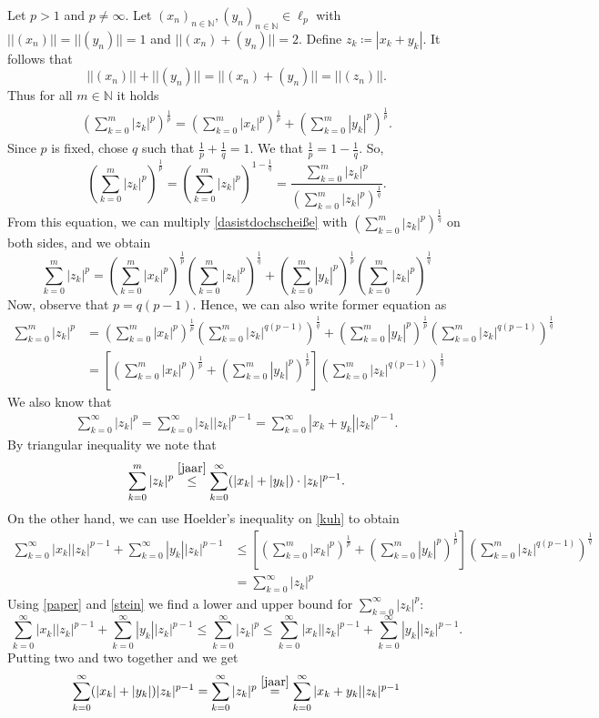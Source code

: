 \documentclass[a4paper]{article}
\begin{document}
Let $p > 1$ and $p \neq \infty$. Let $(x_n)_{n \in \mathbb N}, (y_n)_{n \in \mathbb N} \in \ell_p$ with $||(x_n)|| = || (y_n) || = 1$ and $||(x_n) + (y_n)|| = 2$. Define $z_k \coloneqq |x_k + y_k|$. It follows that
\[
    ||(x_n)|| + || (y_n)|| = ||(x_n) + (y_n) || = ||(z_n)||.
\]
Thus for all $m \in \mathbb N$ it holds
\begin{align}\label{dasistdochscheiße}
    (\sum^m_{k=0} |z_k|^p)^{\frac{1}{p}} = (\sum^m_{k=0} |x_k|^p)^{\frac{1}{p}} + (\sum^m_{k=0} |y_k|^p)^{\frac{1}{p}}.
\end{align}
Since $p$ is fixed, chose $q$ such that $\frac{1}{p}+\frac{1}{q} = 1$. We that $\frac{1}{p} = 1 - \frac{1}{q}$. So, $$(\sum^m_{k=0} |z_k|^p)^{\frac{1}{p}} = (\sum^m_{k=0} |z_k|^p)^{1 - \frac{1}{q}} = \frac{\sum^m_{k=0} |z_k|^p}{(\sum^m_{k=0} |z_k|^p)^{\frac{1}{q}}}.$$
From this equation, we can multiply \eqref{dasistdochscheiße} with $(\sum^m_{k=0} |z_k|^p)^{\frac{1}{q}}$ on both sides, and we obtain
\[
    \sum^m_{k=0} |z_k|^p = (\sum^m_{k=0} |x_k|^p)^{\frac{1}{p}}(\sum^m_{k=0} |z_k|^p)^{\frac{1}{q}} + (\sum^m_{k=0} |y_k|^p)^{\frac{1}{p}}(\sum^m_{k=0} |z_k|^p)^{\frac{1}{q}}
\]
Now, observe that $p = q(p-1)$. Hence, we can also write  former equation as 
\begin{align}
    \sum^m_{k=0} |z_k|^p &= (\sum^m_{k=0} |x_k|^p)^{\frac{1}{p}}(\sum^m_{k=0} |z_k|^{ q(p-1)})^{\frac{1}{q}}
    + (\sum^m_{k=0} |y_k|^p)^{\frac{1}{p}}(\sum^m_{k=0} |z_k|^{ q(p-1)})^{\frac{1}{q}} \nonumber \\
    &= [(\sum^m_{k=0} |x_k|^p)^{\frac{1}{p}} + (\sum^m_{k=0} |y_k|^p)^{\frac{1}{p}}](\sum^m_{k=0} |z_k|^{ q(p-1)})^{\frac{1}{q}} \label{kuh}
\end{align}
We also know that
\begin{align}\label{jaar}
    \sum^\infty_{k=0} |z_k|^p = \sum^\infty_{k=0}|z_k||z_k|^{p-1} = \sum^\infty_{k=0}|x_k+y_k||z_k|^{p-1}. 
\end{align}
By triangular inequality we note that
\begin{align}\label{paper}
\sum^m_{k=0}|z_k|^p \overset{\eqref{jaar}}{\leq} \sum^{\infty}_{k=0}(|x_k|+|y_k|) \cdot |z_k|^{p-1}.
\end{align}
On the other hand, we can use Hoelder's inequality on \eqref{kuh} to obtain
\begin{align}
    \sum^{\infty}_{k=0}|x_k| |z_k|^{p-1} + \sum^{\infty}_{k=0}|y_k| |z_k|^{p-1} &\leq [(\sum^m_{k=0} |x_k|^p)^{\frac{1}{p}} + (\sum^m_{k=0} |y_k|^p)^{\frac{1}{p}}](\sum^m_{k=0} |z_k|^{ q(p-1)})^{\frac{1}{q}} \nonumber \\
    &= \sum^\infty_{k=0}|z_k|^p \label{stein}
\end{align}
Using \eqref{paper} and \eqref{stein} we find a lower and upper bound for $\sum^\infty_{k=0}|z_k|^p$:
\[
    \sum^{\infty}_{k=0}|x_k||z_k|^{p-1}+\sum^{\infty}_{k=0}|y_k||z_k|^{p-1}  \leq \sum^\infty_{k=0}|z_k|^p  \leq \sum^{\infty}_{k=0}|x_k||z_k|^{p-1}+\sum^{\infty}_{k=0}|y_k||z_k|^{p-1}.
\]
Putting two and two together and we get
\begin{align}\label{pika}
   \sum^{\infty}_{k=0}(|x_k|+|y_k|)|z_k|^{p-1}  =  \sum^\infty_{k=0}|z_k|^p
    \overset{\eqref{jaar}}{=}\sum^\infty_{k=0}|x_k+y_k||z_k|^{p-1}
\end{align}
\end{document}

